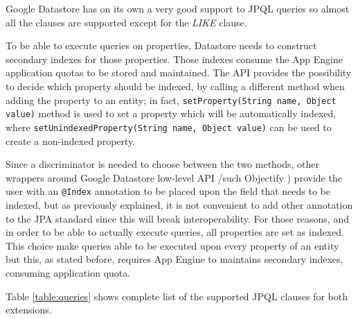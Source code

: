 \newparagraph Google Datastore has on its own a very good support to JPQL queries so almost all the clauses are supported except for the \textit{LIKE} clause.

\noindent To be able to execute queries on properties, Datastore needs to construct secondary indexes for those properties. Those indexes consume the App Engine application quotas to be stored and maintained. The API provides the possibility to decide which property should be indexed, by calling a different method when adding the property to an entity; in fact, \texttt{setProperty(String name, Object value)} method is used to set a property which will be automatically indexed, where \texttt{setUnindexedProperty(String name, Object value)} can be used to create a non-indexed property.

\noindent Since a discriminator is needed to choose between the two methods, other wrappers around Google Datastore low-level API /such Objectify \cite{online:objectify}) provide the user with an \texttt{@Index} annotation to be placed upon the field that needs to be indexed, but as previously explained, it is not convenient to add other annotation to the JPA standard since this will break interoperability. For those reasons, and in order to be able to actually execute queries, all properties are set as indexed. This choice make queries able to be executed upon every property of an entity but this, as stated before, requires App Engine to maintains secondary indexes, consuming application quota.

\newparagraph Table \ref{table:queries} shows complete list of the supported JPQL clauses for both extensions.

